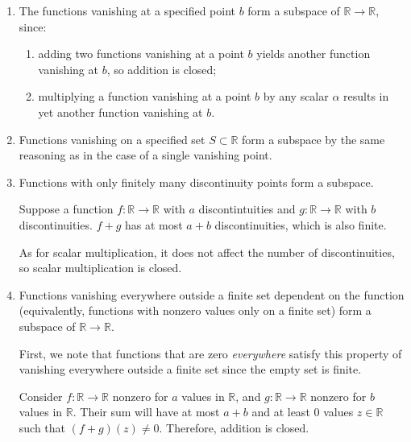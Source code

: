 \documentclass{article}
\newcommand{\R}{\mathbb{R}}
\begin{document}
\begin{enumerate}
\begin{enumerate}
            \item The functions vanishing at a specified point $b$ form a
                subspace of $\R \to \R$, since:
                \begin{enumerate}
                    \item adding two functions vanishing at a point $b$ yields
                        another function vanishing at $b$, so addition is
                        closed;
                    \item multiplying a function vanishing at a point $b$ by
                        any scalar $\alpha$ results in yet another function
                        vanishing at $b$.
                \end{enumerate}

            \item Functions vanishing on a specified set $S \subset \R$ form a
                subspace by the same reasoning as in the case of a single
                vanishing point.

            \item Functions with only finitely many discontinuity points form a
                subspace.

                Suppose a function $f : \R \to \R$ with $a$ discontintuities
                and $g : \R \to \R$ with $b$ discontinuities.  $f + g$ has at
                most $a + b$ discontinuities, which is also finite.

                As for scalar multiplication, it does not affect the number of
                discontinuities, so scalar multiplication is closed.

            \item Functions vanishing everywhere outside a finite set dependent
                on the function (equivalently, functions with nonzero values
                only on a finite set) form a subspace of $\R \to \R$.

                First, we note that functions that are zero \emph{everywhere}
                satisfy this property of vanishing everywhere outside a finite
                set since the empty set is finite.

                Consider $f : \R \to \R$ nonzero for $a$ values in $\R$, and $g
                : \R \to \R$ nonzero for $b$ values in $\R$. Their sum will
                have at most $a + b$ and at least $0$ values $z \in \R$ such
                that $(f + g)(z) \neq 0$. Therefore, addition is closed.


\end{enumerate}
\end{enumerate}
\end{document}
